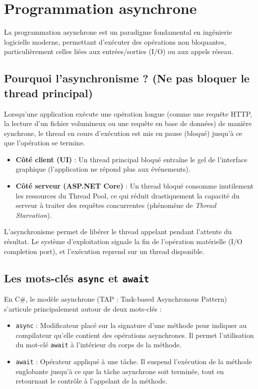 \section{Programmation asynchrone}

La programmation asynchrone est un paradigme fondamental en ingénierie logicielle moderne, permettant d'exécuter des opérations non bloquantes, particulièrement celles liées aux entrées/sorties (I/O) ou aux appels réseau. 

\subsection{Pourquoi l'asynchronisme ? (Ne pas bloquer le thread principal)}

Lorsqu'une application exécute une opération longue (comme une requête HTTP, la lecture d'un fichier volumineux ou une requête en base de données) de manière synchrone, le thread en cours d'exécution est mis en pause (bloqué) jusqu'à ce que l'opération se termine. 
\begin{itemize}
    \item \textbf{Côté client (UI)} : Un thread principal bloqué entraîne le gel de l'interface graphique (l'application ne répond plus aux événements).
    \item \textbf{Côté serveur (ASP.NET Core)} : Un thread bloqué consomme inutilement les ressources du Thread Pool, ce qui réduit drastiquement la capacité du serveur à traiter des requêtes concurrentes (phénomène de \textit{Thread Starvation}).
\end{itemize}

L'asynchronisme permet de libérer le thread appelant pendant l'attente du résultat. Le système d'exploitation signale la fin de l'opération matérielle (I/O completion port), et l'exécution reprend sur un thread disponible.

\subsection{Les mots-clés \texttt{async} et \texttt{await}}

En C\#, le modèle asynchrone (TAP : Task-based Asynchronous Pattern) s'articule principalement autour de deux mots-clés :
\begin{itemize}
    \item \texttt{async} : Modificateur placé sur la signature d'une méthode pour indiquer au compilateur qu'elle contient des opérations asynchrones. Il permet l'utilisation du mot-clé \texttt{await} à l'intérieur du corps de la méthode.
    \item \texttt{await} : Opérateur appliqué à une tâche. Il suspend l'exécution de la méthode englobante jusqu'à ce que la tâche asynchrone soit terminée, tout en retournant le contrôle à l'appelant de la méthode.
\end{itemize}

